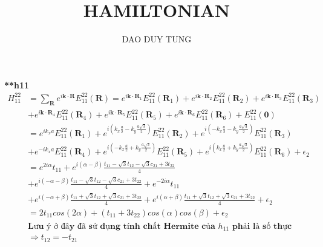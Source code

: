 \documentclass[10Pt]{article}
\title{\Huge{HAMILTONIAN}}
\begin{document}
	\author{DAO DUY TUNG}
	
	\maketitle
	
	\textbf{**h11}
\begin{align*}
	H^{22}_{11} &= \sum_{\mathbf{R}} e^{i \mathbf{k} \cdot \mathbf{R}} E^{22}_{11}(\mathbf{R}) 
	= e^{i \mathbf{k} \cdot \mathbf{R}_1} E^{22}_{11}(\mathbf{R}_1)
	+ e^{i \mathbf{k} \cdot \mathbf{R}_2} E^{22}_{11}(\mathbf{R}_2)
	+ e^{i \mathbf{k} \cdot \mathbf{R}_3} E^{22}_{11}(\mathbf{R}_3)\\
	&+ e^{i \mathbf{k} \cdot \mathbf{R}_4} E^{22}_{11}(\mathbf{R}_4)
	+ e^{i \mathbf{k} \cdot \mathbf{R}_5} E^{22}_{11}(\mathbf{R}_5)
	+ e^{i \mathbf{k} \cdot \mathbf{R}_6} E^{22}_{11}(\mathbf{R}_6)
	+ E^{22}_{11}(\mathbf{0})\\
	&= e^{i k_x a} E^{22}_{11}(\mathbf{R}_1)
	+ e^{i \left( k_x \frac{a}{2} - k_y \frac{a\sqrt{3}}{2} \right)} E^{22}_{11}(\mathbf{R}_2)
	+ e^{i \left( -k_x \frac{a}{2} - k_y \frac{a\sqrt{3}}{2} \right)} E^{22}_{11}(\mathbf{R}_3)\\
	&+ e^{-i k_x a } E^{22}_{11}(\mathbf{R}_4) 
	+ e^{i \left( -k_x \frac{a}{2} + k_y \frac{a\sqrt{3}}{2} \right)} E^{22}_{11}(\mathbf{R}_5)
	+ e^{i \left( k_x \frac{a}{2} + k_y \frac{a\sqrt{3}}{2} \right)} E^{22}_{11}(\mathbf{R}_6) + \epsilon_2\\
	&= e^{2i\alpha} t_{11} + e^{i \left( \alpha - \beta \right)} \frac{t_{11} -\sqrt{3}t_{12} - \sqrt{3}c_{21} + 3t_{22}}{4}\\
	&+ e^{i \left( -\alpha - \beta \right)} \frac{t_{11} -\sqrt{3}t_{12} - \sqrt{3}c_{21} + 3t_{22}}{4} + e^{-2i\alpha} t_{11}\\
	&+ e^{i \left( -\alpha + \beta \right)} \frac{t_{11} +\sqrt{3}t_{12} + \sqrt{3}c_{21} + 3t_{22}}{4} + e^{i \left( \alpha + \beta \right)} \frac{t_{11} +\sqrt{3}t_{12} + \sqrt{3}c_{21} + 3t_{22}}{4} + \epsilon_2\\
	&= 2t_{11}cos(2\alpha) + \left (t_{11} + 3t_{22}\right )cos(\alpha)cos(\beta) + \epsilon_2\\ 
	&\textbf{Lưu ý ở đây đã sử dụng tính chất Hermite của $h_{11}$ phải là số thực}\\ &\Rightarrow t_{12} = - t_{21}
\end{align*}
\end{document}
